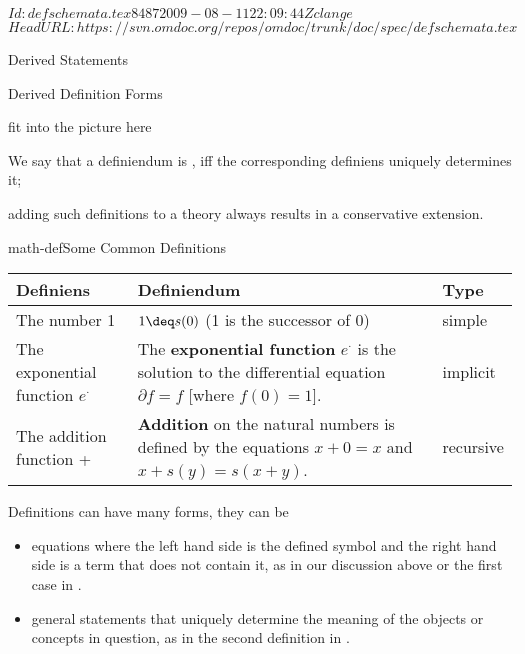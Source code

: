 \svnInfo $Id: defschemata.tex 8487 2009-08-11 22:09:44Z clange $
\svnKeyword $HeadURL: https://svn.omdoc.org/repos/omdoc/trunk/doc/spec/defschemata.tex $

\begin{omgroup}{Derived Statements}

\begin{module}[id=derived-defs]
\begin{omgroup}[short=Derived Definitions]{Derived Definition Forms}

\begin{oldpart}{fit into the picture here}
\begin{definition}[display=flow,id=well-defined.def]
  We say that a definiendum is {}, iff the corresponding definiens
  uniquely determines it;
\end{definition}
adding such definitions to a theory always results in a conservative extension.

\begin{myfig}{math-def}{Some Common Definitions}\small
 \begin{tabular}{|p{2.2cm}|p{7cm}|l|}\hline
   Definiens & Definiendum & Type \\\hline\hline
   The number 1 & $1\deq s(0)$ (1 is the successor of 0) & simple\\\hline
   The exponential function $e^\cdot$ 
         &  The {\textbf{exponential function}} $e^\cdot$ is the solution to the
   differential equation $\partial f=f$ [where $f(0)=1$]. & implicit\\\hline
   The addition function + & {\textbf{Addition}} on the natural numbers is defined by the equations
   $x+0=x$ and $x+s(y)=s(x+y)$. & recursive\\\hline
 \end{tabular}
\end{myfig}
Definitions can have many forms, they can be
\begin{itemize}
\item equations where the left hand side is the defined symbol and the right hand side is
  a term that does not contain it, as in our discussion above or the first case in
  {}. 
\item general statements that uniquely determine the meaning of the objects or concepts in
  question, as in the second definition in {}. 
  

\end{itemize}
\end{oldpart}
\end{omgroup}
\end{module}
\end{omgroup}
